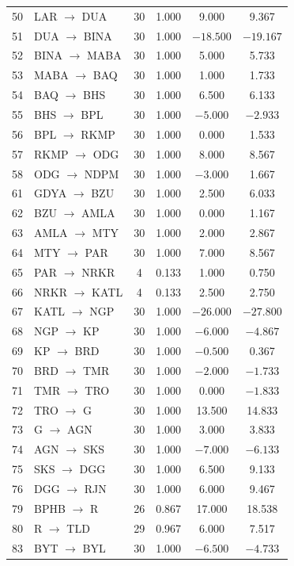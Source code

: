\documentclass[conference]{IEEEtran}
\begin{document}
\begin{table}[!t]
\begin{minipage}[t]{0.485\textwidth}
\begin{tabular}{@{}rlcccc@{}}
50 & LAR $\to$ DUA & 30 & 1.000 & 9.000 & 9.367 \\
51 & DUA $\to$ BINA & 30 & 1.000 & $-18.500$ & $-19.167$ \\
52 & BINA $\to$ MABA & 30 & 1.000 & 5.000 & 5.733 \\
53 & MABA $\to$ BAQ & 30 & 1.000 & 1.000 & 1.733 \\
54 & BAQ $\to$ BHS & 30 & 1.000 & 6.500 & 6.133 \\
55 & BHS $\to$ BPL & 30 & 1.000 & $-5.000$ & $-2.933$ \\
56 & BPL $\to$ RKMP & 30 & 1.000 & 0.000 & 1.533 \\
57 & RKMP $\to$ ODG & 30 & 1.000 & 8.000 & 8.567 \\
58 & ODG $\to$ NDPM & 30 & 1.000 & $-3.000$ & 1.667 \\
61 & GDYA $\to$ BZU & 30 & 1.000 & 2.500 & 6.033 \\
62 & BZU $\to$ AMLA & 30 & 1.000 & 0.000 & 1.167 \\
63 & AMLA $\to$ MTY & 30 & 1.000 & 2.000 & 2.867 \\
64 & MTY $\to$ PAR & 30 & 1.000 & 7.000 & 8.567 \\
65 & PAR $\to$ NRKR & 4 & 0.133 & 1.000 & 0.750 \\
66 & NRKR $\to$ KATL & 4 & 0.133 & 2.500 & 2.750 \\
67 & KATL $\to$ NGP & 30 & 1.000 & $-26.000$ & $-27.800$ \\
68 & NGP $\to$ KP & 30 & 1.000 & $-6.000$ & $-4.867$ \\
69 & KP $\to$ BRD & 30 & 1.000 & $-0.500$ & 0.367 \\
70 & BRD $\to$ TMR & 30 & 1.000 & $-2.000$ & $-1.733$ \\
71 & TMR $\to$ TRO & 30 & 1.000 & 0.000 & $-1.833$ \\
72 & TRO $\to$ G & 30 & 1.000 & 13.500 & 14.833 \\
73 & G $\to$ AGN & 30 & 1.000 & 3.000 & 3.833 \\
74 & AGN $\to$ SKS & 30 & 1.000 & $-7.000$ & $-6.133$ \\
75 & SKS $\to$ DGG & 30 & 1.000 & 6.500 & 9.133 \\
76 & DGG $\to$ RJN & 30 & 1.000 & 6.000 & 9.467 \\
79 & BPHB $\to$ R & 26 & 0.867 & 17.000 & 18.538 \\
80 & R $\to$ TLD & 29 & 0.967 & 6.000 & 7.517 \\
83 & BYT $\to$ BYL & 30 & 1.000 & $-6.500$ & $-4.733$ \\
\bottomrule
\end{tabular}
\end{minipage}
\end{table}
\end{document}
